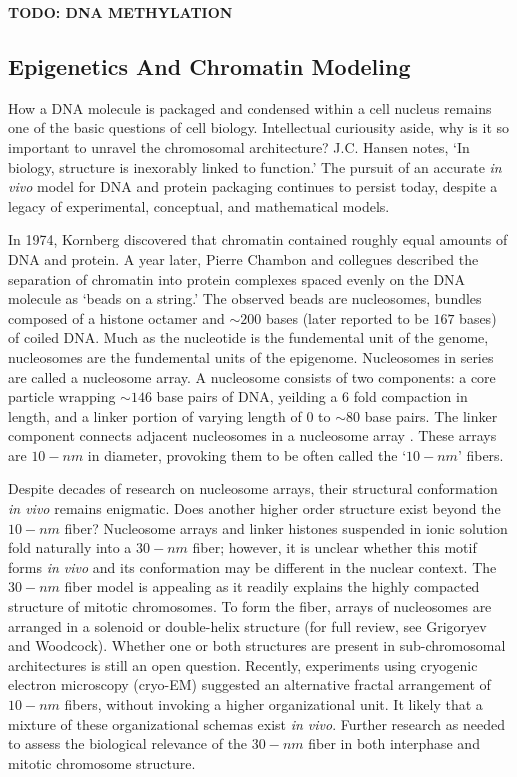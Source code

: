 \documentclass[phd,tocprelim]{cornell}
\begin{document}
\textbf{TODO: DNA METHYLATION}

\subsection{Epigenetics And Chromatin Modeling}

How a DNA molecule is packaged and condensed within a cell nucleus remains
one of the basic questions of cell biology.  Intellectual curiousity aside,
why is it so important to unravel the chromosomal architecture?  J.C. Hansen
notes, `In biology, structure is inexorably linked to function.'\cite{hansen2012}
The pursuit of an accurate \textit{in vivo} model for DNA and protein packaging
continues to persist today, despite a legacy of experimental, conceptual, and
mathematical models.

In 1974, Kornberg discovered that chromatin contained roughly equal amounts of
DNA and protein\cite{kornberg1974}.  A year later, Pierre Chambon and collegues
described the separation of chromatin into protein complexes spaced evenly on the DNA
molecule as `beads on a string.'\cite{oudet1975}  The observed beads are nucleosomes,
bundles composed of a histone octamer and $\sim200$ bases (later reported to be
$167$ bases\cite{robinson2006}) of coiled DNA\@.
Much as the nucleotide is the fundemental unit of the genome, nucleosomes are
the fundemental units of the epigenome.  Nucleosomes in series are called a
nucleosome array.  A nucleosome consists of two components: a core particle
wrapping $\sim146$ base pairs of DNA, yeilding a 6 fold compaction in length,
and a linker portion of varying length of $0$ to $\sim80$ base pairs.  The
linker component connects adjacent nucleosomes in a nucleosome array\cite{wu2007}%
\cite{hansen2012}.  These arrays are $10-nm$ in diameter, provoking them to be
often called the `$10-nm$' fibers.

Despite decades of research on nucleosome arrays, their structural conformation
\textit{in vivo} remains enigmatic.   Does another higher order structure exist
beyond the $10-nm$ fiber?  Nucleosome arrays and linker histones suspended in ionic
solution fold naturally into a $30-nm$ fiber\cite{tremethick2007}; however, it
is unclear whether this motif forms \textit{in vivo} and its conformation may
be different in the nuclear context\cite{bian2012}.  The $30-nm$ fiber model
is appealing as it readily explains the highly compacted structure of mitotic
chromosomes.  To form the fiber, arrays of nucleosomes are arranged in a
solenoid or double-helix structure (for full review, see Grigoryev and
Woodcock\cite{grigoryev2012}).  Whether one or both structures are present in
sub-chromosomal architectures is still an open question\cite{song2014}.  Recently,
experiments using cryogenic electron microscopy (cryo-EM) suggested an
alternative fractal arrangement of $10-nm$ fibers, without invoking a higher
organizational unit\cite{nishino2012}\cite{hansen2012}.  It likely that a
mixture of these organizational schemas exist \textit{in vivo}.  Further
research as needed to assess the biological relevance of the $30-nm$ fiber in
both interphase and mitotic chromosome structure.
\end{document}
